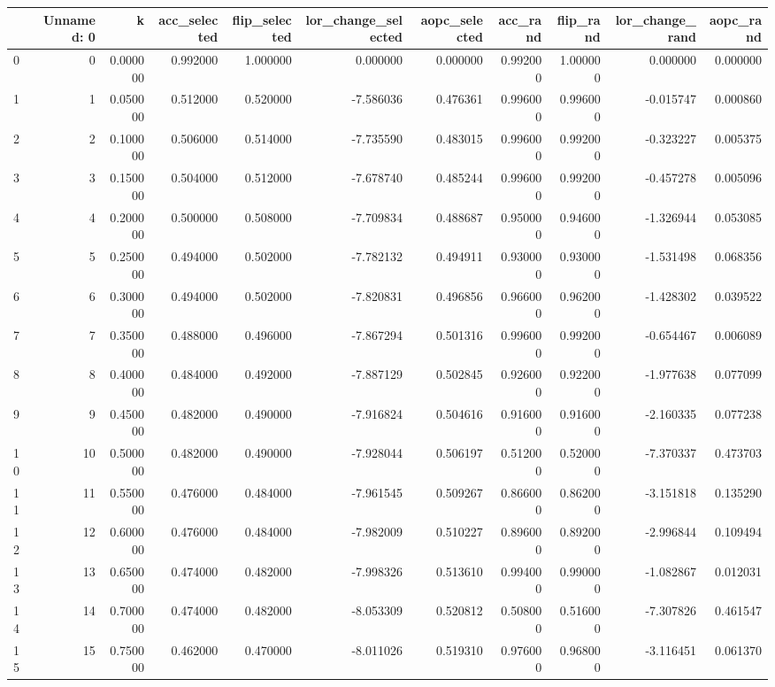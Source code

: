 \begin{tabular}{lrrrrrrrrrr}
\toprule
 & Unnamed: 0 & k & acc_selected & flip_selected & lor_change_selected & aopc_selected & acc_rand & flip_rand & lor_change_rand & aopc_rand \\
\midrule
0 & 0 & 0.000000 & 0.992000 & 1.000000 & 0.000000 & 0.000000 & 0.992000 & 1.000000 & 0.000000 & 0.000000 \\
1 & 1 & 0.050000 & 0.512000 & 0.520000 & -7.586036 & 0.476361 & 0.996000 & 0.996000 & -0.015747 & 0.000860 \\
2 & 2 & 0.100000 & 0.506000 & 0.514000 & -7.735590 & 0.483015 & 0.996000 & 0.992000 & -0.323227 & 0.005375 \\
3 & 3 & 0.150000 & 0.504000 & 0.512000 & -7.678740 & 0.485244 & 0.996000 & 0.992000 & -0.457278 & 0.005096 \\
4 & 4 & 0.200000 & 0.500000 & 0.508000 & -7.709834 & 0.488687 & 0.950000 & 0.946000 & -1.326944 & 0.053085 \\
5 & 5 & 0.250000 & 0.494000 & 0.502000 & -7.782132 & 0.494911 & 0.930000 & 0.930000 & -1.531498 & 0.068356 \\
6 & 6 & 0.300000 & 0.494000 & 0.502000 & -7.820831 & 0.496856 & 0.966000 & 0.962000 & -1.428302 & 0.039522 \\
7 & 7 & 0.350000 & 0.488000 & 0.496000 & -7.867294 & 0.501316 & 0.996000 & 0.992000 & -0.654467 & 0.006089 \\
8 & 8 & 0.400000 & 0.484000 & 0.492000 & -7.887129 & 0.502845 & 0.926000 & 0.922000 & -1.977638 & 0.077099 \\
9 & 9 & 0.450000 & 0.482000 & 0.490000 & -7.916824 & 0.504616 & 0.916000 & 0.916000 & -2.160335 & 0.077238 \\
10 & 10 & 0.500000 & 0.482000 & 0.490000 & -7.928044 & 0.506197 & 0.512000 & 0.520000 & -7.370337 & 0.473703 \\
11 & 11 & 0.550000 & 0.476000 & 0.484000 & -7.961545 & 0.509267 & 0.866000 & 0.862000 & -3.151818 & 0.135290 \\
12 & 12 & 0.600000 & 0.476000 & 0.484000 & -7.982009 & 0.510227 & 0.896000 & 0.892000 & -2.996844 & 0.109494 \\
13 & 13 & 0.650000 & 0.474000 & 0.482000 & -7.998326 & 0.513610 & 0.994000 & 0.990000 & -1.082867 & 0.012031 \\
14 & 14 & 0.700000 & 0.474000 & 0.482000 & -8.053309 & 0.520812 & 0.508000 & 0.516000 & -7.307826 & 0.461547 \\
15 & 15 & 0.750000 & 0.462000 & 0.470000 & -8.011026 & 0.519310 & 0.976000 & 0.968000 & -3.116451 & 0.061370 \\

\end{tabular}
